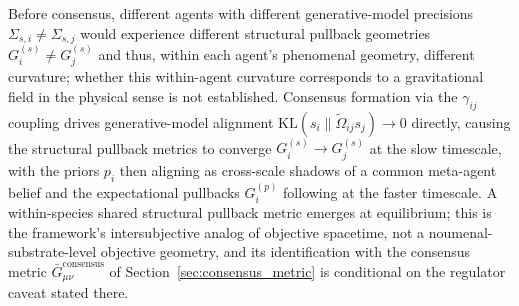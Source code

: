 \documentclass[11pt]{article}
\begin{document}
Before consensus, different agents with different generative-model precisions $\Sigma_{s,i} \neq \Sigma_{s,j}$ would experience different structural pullback geometries $G^{(s)}_i \neq G^{(s)}_j$ and thus, within each agent's phenomenal geometry, different curvature; whether this within-agent curvature corresponds to a gravitational field in the physical sense is not established. Consensus formation via the $\gamma_{ij}$ coupling drives generative-model alignment $\mathrm{KL}(s_i\|\tilde\Omega_{ij}s_j) \to 0$ directly, causing the structural pullback metrics to converge $G^{(s)}_i \to G^{(s)}_j$ at the slow timescale, with the priors $p_i$ then aligning as cross-scale shadows of a common meta-agent belief and the expectational pullbacks $G^{(p)}_i$ following at the faster timescale. A within-species shared structural pullback metric emerges at equilibrium; this is the framework's intersubjective analog of objective spacetime, not a noumenal-substrate-level objective geometry, and its identification with the consensus metric $\bar{G}_{\mu\nu}^{\text{consensus}}$ of Section~\ref{sec:consensus_metric} is conditional on the regulator caveat stated there.
\end{document}
